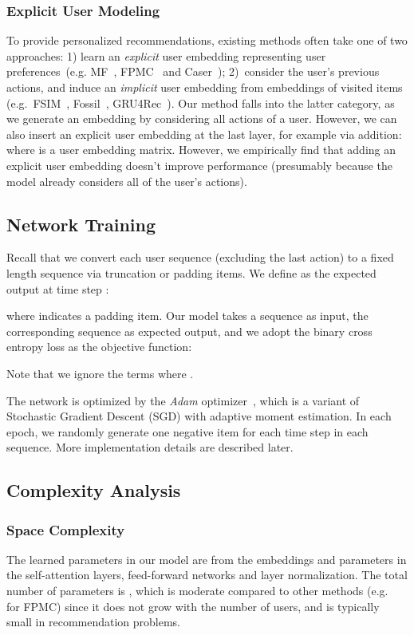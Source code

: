 \documentclass[conference]{IEEEtran}
\newcommand{\xhdr}[1]{\subsubsection*{\bf #1}}
\begin{document}
\xhdr{Explicit User Modeling} To provide personalized recommendations, existing methods often take one of two approaches: 1) learn an \emph{explicit} user embedding representing user preferences~(e.g. MF~\cite{MF}, FPMC~\cite{rendle2010fpmc} and Caser~\cite{DBLP:conf/wsdm/TangW18}); 2)~consider the user's previous actions, 
and induce an \emph{implicit} user embedding from embeddings of visited items (e.g.~FSIM~\cite{kabbur2013fism}, Fossil~\cite{DBLP:conf/icdm/HeM16}, GRU4Rec~\cite{DBLP:journals/corr/HidasiKBT15}). Our method falls into the latter category, as we generate an embedding  by considering all actions of a user. However, we can also insert an explicit user embedding at the last layer, for example via addition:  where  is 
a
user embedding matrix. However, we empirically find 
that
adding 
an
explicit user embedding doesn't improve 
performance (presumably because the model already considers
all of
the user's
actions). 


\subsection{Network Training}

Recall that we convert each user sequence (excluding the last action)  to a fixed length sequence  
via truncation
or padding items. We define  as the expected output at time step : 

where  indicates a padding item. Our model takes a sequence  as input, the corresponding sequence  as expected output, and we adopt the binary cross entropy loss as the objective function:

Note that we ignore the terms where .

The network is optimized by the \emph{Adam} optimizer~\cite{DBLP:journals/corr/KingmaB14}, which is a variant of Stochastic Gradient Descent (SGD) with adaptive moment estimation. In each epoch, we randomly generate one negative item  for each time step in each sequence. 
More implementation details 
are described later.


\subsection{Complexity Analysis}
\label{sec:complexity}

\xhdr{Space Complexity} The learned parameters in our model are from the embeddings and parameters in the self-attention layers, feed-forward networks and layer normalization. The total number of parameters is , which is moderate compared to other methods (e.g.~ for FPMC) since 
it does not grow with
the number of users, and  is typically small in recommendation problems.
\end{document}
